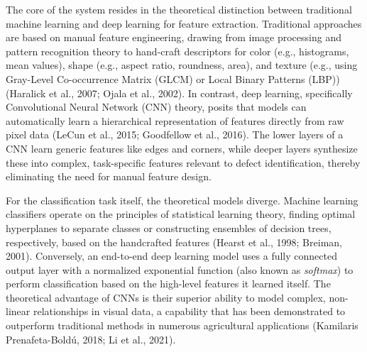 {The core of the system resides in the theoretical distinction between traditional machine learning and deep learning for feature extraction. Traditional approaches are based on manual feature engineering, drawing from image processing and pattern recognition theory to hand-craft descriptors for color (e.g., histograms, mean values), shape (e.g., aspect ratio, roundness, area), and texture (e.g., using Gray-Level Co-occurrence Matrix (GLCM) or Local Binary Patterns (LBP)) (Haralick et al., 2007; Ojala et al., 2002). In contrast, deep learning, specifically Convolutional Neural Network (CNN) theory, posits that models can automatically learn a hierarchical representation of features directly from raw pixel data (LeCun et al., 2015; Goodfellow et al., 2016). The lower layers of a CNN learn generic features like edges and corners, while deeper layers synthesize these into complex, task-specific features relevant to defect identification, thereby eliminating the need for manual feature design.

For the classification task itself, the theoretical models diverge. Machine learning classifiers operate on the principles of statistical learning theory, finding optimal hyperplanes to separate classes or constructing ensembles of decision trees, respectively, based on the handcrafted features (Hearst et al., 1998; Breiman, 2001). Conversely, an end-to-end deep learning model uses a fully connected output layer with a normalized exponential function (also known as \textit{softmax}) to perform classification based on the high-level features it learned itself. The theoretical advantage of CNNs is their superior ability to model complex, non-linear relationships in visual data, a capability that has been demonstrated to outperform traditional methods in numerous agricultural applications (Kamilaris  Prenafeta-Boldú, 2018; Li et al., 2021).

}